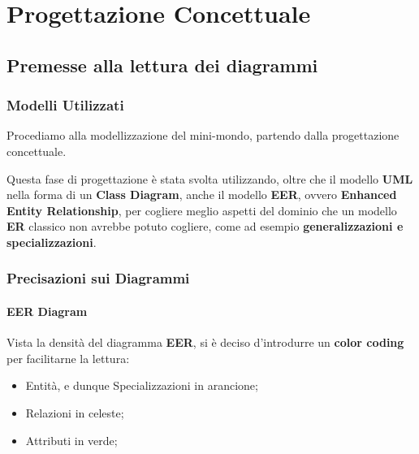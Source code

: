 \chapter{Progettazione Concettuale}

\section{Premesse alla lettura dei diagrammi}

\subsection{Modelli Utilizzati}

Procediamo alla modellizzazione del mini-mondo, partendo dalla progettazione concettuale.

Questa fase di progettazione è stata svolta utilizzando, oltre che il modello \textbf{UML} nella forma di un \textbf{Class Diagram}, anche il modello \textbf{EER}, ovvero \textbf{Enhanced Entity Relationship}, per cogliere meglio aspetti del dominio che un modello \textbf{ER} classico non avrebbe potuto cogliere, come ad esempio \textbf{generalizzazioni e specializzazioni}.

\subsection{Precisazioni sui Diagrammi}

\subsubsection{EER Diagram}
Vista la densità del diagramma \textbf{EER}, si è deciso d'introdurre un \textbf{color coding} per facilitarne la lettura:

\begin{itemize}
  \item \textcolor{PRIMARY}{Entità}, e dunque Specializzazioni in \textcolor{PRIMARY}{arancione};
  \item \textcolor{CONTRAST}{Relazioni} in \textcolor{CONTRAST}{celeste};
  \item \textcolor{NEWGREEN}{Attributi} in \textcolor{NEWGREEN}{verde};
\end{itemize}

